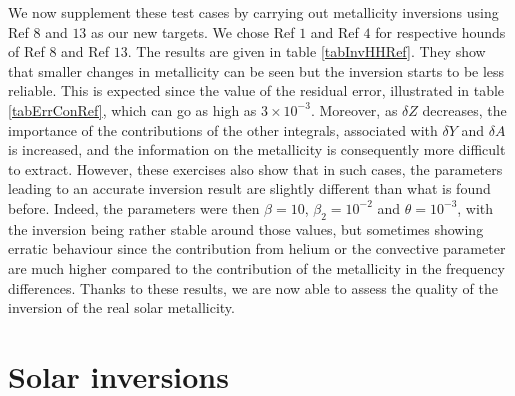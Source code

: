 \documentclass[a4paper,fleqn,usenatbib]{mnras}
\begin{document}
We now supplement these test cases by carrying out metallicity inversions using Ref $8$ and $13$ as our new targets. We chose Ref $1$ and Ref $4$ for respective hounds of Ref $8$ and Ref $13$. The results are given in table \ref{tabInvHHRef}. They show that smaller changes in metallicity can be seen but the inversion starts to be less reliable. This is expected since the value of the residual error, illustrated in table  \ref{tabErrConRef}, which can go as high as $3 \times 10^{-3}$. Moreover, as $\delta Z$ decreases, the importance of the contributions of the other integrals, associated with $\delta Y$ and $\delta A$ is increased, and the information on the metallicity is consequently more difficult to extract. However, these exercises also show that in such cases, the parameters leading to an accurate inversion result are slightly different than what is found before. Indeed, the parameters were then $\beta=10$, $\beta_{2}=10^{-2}$ and $\theta=10^{-3}$, with the inversion being rather stable around those values, but sometimes showing erratic behaviour since the contribution from helium or the convective parameter are much higher compared to the contribution of the metallicity in the frequency differences. Thanks to these results, we are now able to assess the quality of the inversion of the real solar metallicity.

\section{Solar inversions} \label{sec:suninv}
\end{document}

